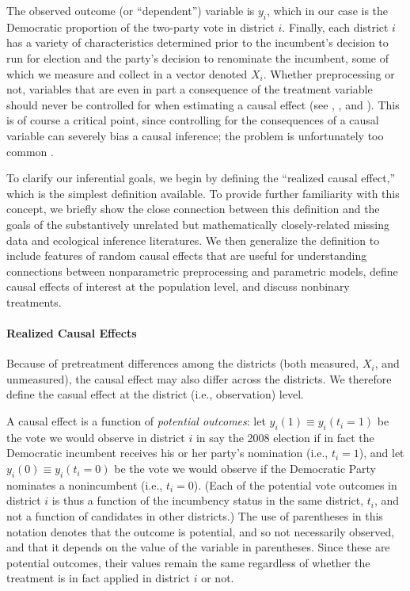 \documentclass[11pt,titlepage]{article}
\begin{document}
The observed outcome (or ``dependent'') variable is $y_i$, which in
our case is the Democratic proportion of the two-party vote in
district $i$.  Finally, each district $i$ has a variety of
characteristics determined prior to the incumbent's decision to run
for election and the party's decision to renominate the incumbent,
some of which we measure and collect in a vector denoted $X_i$.
Whether preprocessing or not, variables that are even in part a
consequence of the treatment variable should never be controlled for
when estimating a causal effect (see \citealt[][Section 4.2]{Cox58},
\citet{Rosenbaum84}, and \citealt[][pp.73--4]{Rosenbaum02}).  This is
of course a critical point, since controlling for the consequences of
a causal variable can severely bias a causal inference; the problem is
unfortunately too common \citep{KinZen06a}.

To clarify our inferential goals, we begin by defining the ``realized
causal effect,'' which is the simplest definition available.  To
provide further familiarity with this concept, we briefly show the
close connection between this definition and the goals of the
substantively unrelated but mathematically closely-related missing
data and ecological inference literatures.  We then generalize the
definition to include features of random causal effects that are
useful for understanding connections between nonparametric
preprocessing and parametric models, define causal effects of interest
at the population level, and discuss nonbinary treatments.

\paragraph{Realized Causal Effects}
Because of pretreatment differences among the districts (both
measured, $X_i$, and unmeasured), the causal effect may also differ
across the districts.  We therefore define the casual effect at the
district (i.e., observation) level.

A causal effect is a function of \emph{potential outcomes}: let
$y_i(1)\equiv y_i(t_i=1)$ be the vote we would observe in district $i$
in say the 2008 election if in fact the Democratic incumbent receives
his or her party's nomination (i.e., $t_i=1$), and let $y_i(0)\equiv
y_i(t_i=0)$ be the vote we would observe if the Democratic Party
nominates a nonincumbent (i.e., $t_i=0$).  (Each of the potential vote
outcomes in district $i$ is thus a function of the incumbency status
in the same district, $t_i$, and not a function of candidates in other
districts.)  The use of parentheses in this notation denotes that the
outcome is potential, and so not necessarily observed, and that it
depends on the value of the variable in parentheses.  Since these are
potential outcomes, their values remain the same regardless of whether
the treatment is in fact applied in district $i$ or not.
\end{document}
